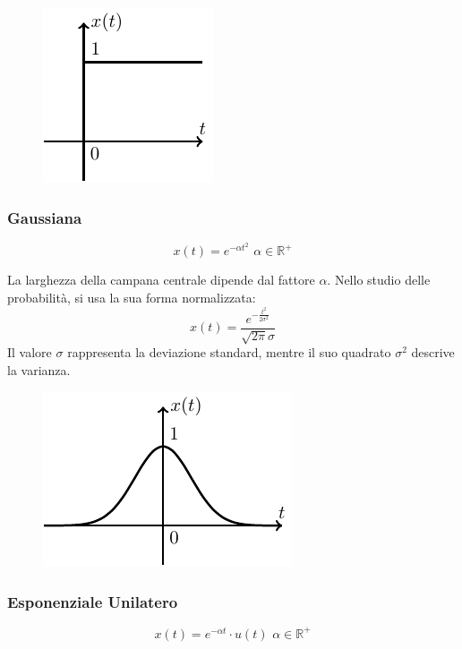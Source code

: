 \documentclass{article}
\numberwithin{equation}{subsection}
\begin{document}
\begin{figure}[H]%
    \centering
    \includegraphics{gradino.pdf}%
\end{figure}

\subsubsection{Gaussiana}

\begin{equation}
    x(t)=e^{-\alpha t^2}\,\,\alpha\in\mathbb{R}^+
\end{equation}

La larghezza della campana centrale dipende dal fattore $\alpha$. Nello studio delle probabilità, si usa la sua forma normalizzata:
\begin{equation*}
    x(t)=\displaystyle\frac{e^{-\frac{t^2}{2\sigma^2}}}{\sqrt{2\pi}\sigma}
\end{equation*}
Il valore $\sigma$ rappresenta la deviazione standard, mentre il suo quadrato $\sigma^2$ descrive la varianza. 

\begin{figure}[H]%
    \centering
    \includegraphics{gaussiana.pdf}%
\end{figure}

\subsubsection{Esponenziale Unilatero}

\begin{equation}
    x(t)=e^{-\alpha t}\cdot u(t)\,\,\alpha\in\mathbb{R}^+
\end{equation}
\end{document}
